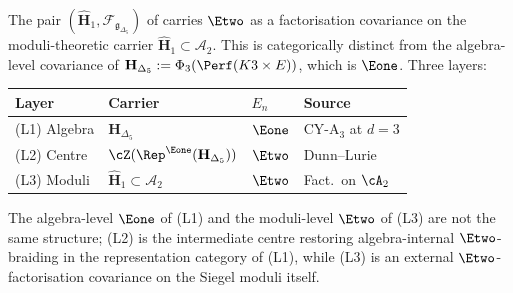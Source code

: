 \begin{warning}
\label{warn:three-en-layers}
The pair
$(\widehat{\mathbf H}_1, \mathcal F_{\mathfrak g_{\Delta_5}})$
of  carries
$\Etwo$ as a factorisation covariance on the moduli-theoretic
carrier $\widehat{\mathbf H}_1 \subset \mathcal A_2$. This is
categorically distinct from the algebra-level covariance of
$\mathbf H_{\Delta_5} := \Phi_3(\Perf(K3 \times E))$, which is
$\Eone$. Three layers:
\begin{center}
\renewcommand{\arraystretch}{1.25}
\begin{tabular}{llll}
\toprule
Layer & Carrier & $E_n$ & Source \\
\midrule
(L1) Algebra & $\mathbf H_{\Delta_5}$ & $\Eone$ &
CY-A$_3$ at $d = 3$ \\
(L2) Centre &
$\cZ(\Rep^{\Eone}(\mathbf H_{\Delta_5}))$ & $\Etwo$ &
Dunn--Lurie \\
(L3) Moduli & $\widehat{\mathbf H}_1 \subset \mathcal A_2$ &
$\Etwo$ & Fact.\ on $\cA_2$ \\
\bottomrule
\end{tabular}
\end{center}
The algebra-level $\Eone$ of (L1) and the moduli-level $\Etwo$
of (L3) are not the same structure; (L2) is the intermediate
centre restoring algebra-internal $\Etwo$-braiding in the
representation category of (L1), while (L3) is an external
$\Etwo$-factorisation covariance on the Siegel moduli itself.
\end{warning}

